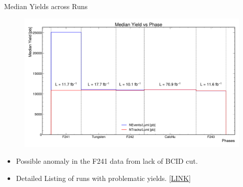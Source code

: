 
\begin{frame}{Median Yields across Runs}
	\begin{figure}
		\includegraphics[width=\linewidth]{./RunwisePlots/MedianYieldsPhase.pdf}
	\end{figure}
	\vspace{-0.5cm}
	\begin{itemize}
		\item Possible anomaly in the F241 data from lack of BCID cut.
		\item Detailed Listing of runs with problematic yields. \href{https://docs.google.com/spreadsheets/d/1nnYFcmhVieSHI5XAVhPiW1K6CoGYGxv2YPchwL0sqH4/edit?usp=sharing}{[LINK]}
	\end{itemize}
\end{frame}

	


